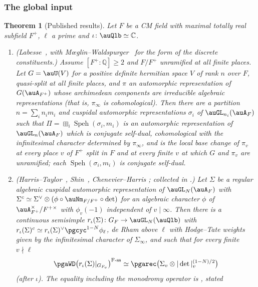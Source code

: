 \documentclass[10pt]{amsart}
\newtheorem{theorem}{Theorem}[section]
\theoremstyle{definition}
\theoremstyle{remark}
\newcommand{\C}{\mathbb C}
\newcommand{\Q}{\mathbb Q}
\begin{document}
\subsubsection{The global input}\label{pga:ss-global}

\begin{theorem}[Published results]\label{pga:lit}
Let $F$ be a CM field with maximal totally real subfield $F^+$, $\ell$ a prime and
$\iota\colon\auQlb\simeq\C$.
\begin{enumerate}
\item[(BC)] \emph{(Labesse~\cite{Labesse}, with M\oe glin--Waldspurger~\cite[Introduction, Th\'eor\`eme, p.~606]{MW89} for the
form of the discrete constituents.)} Assume $[F^+:\Q]\ge2$ and $F/F^+$ unramified at all finite
places. Let $G=\auU(V)$ for a positive definite
hermitian space $V$ of rank $n$ over $F$, quasi-split at all finite places, and $\pi$ an
automorphic representation of $G(\auA_{F^+})$ whose archimedean components are irreducible
algebraic representations (that is, $\pi_\infty$ is cohomological). Then there are a partition
$n=\sum_i n_im_i$ and cuspidal automorphic representations $\sigma_i$ of $\auGL_{n_i}(\auA_F)$ such
that $\Pi=\boxplus_i\operatorname{Speh}(\sigma_i,m_i)$ is an automorphic representation of
$\auGL_n(\auA_F)$ which is conjugate self-dual, cohomological with the infinitesimal character
determined by $\pi_\infty$, and is the local base change of $\pi_v$ at every place $v$ of $F^+$
split in $F$ and at every finite $v$ at which $G$ and $\pi_v$ are unramified; each
$\operatorname{Speh}(\sigma_i,m_i)$ is conjugate self-dual.
\item[(GR)] \emph{(Harris--Taylor~\cite{HarrisTaylor}, Shin~\cite{Shin}, Chenevier--Harris
\cite{ChenevierHarris}; collected in \cite[Thm.~2.1.1]{BLGGT}.)} Let $\Sigma$ be a regular
algebraic cuspidal automorphic representation of $\auGL_N(\auA_F)$ with $\Sigma^c\simeq\Sigma^\vee
\otimes(\phi\circ\auNm_{F/F^+}\circ\det)$ for an algebraic character $\phi$ of
$\auA_{F^+}^\times/F^{+\times}$ with $\phi_v(-1)$ independent of $v\mid\infty$. Then there is a
continuous semisimple $r_\iota(\Sigma)\colon G_F\to\auGL_N(\auQlb)$ with $r_\iota(\Sigma)^c\simeq
r_\iota(\Sigma)^\vee\pgcyc^{1-N}\phi_\ell$, de Rham above $\ell$ with Hodge--Tate weights given by
the infinitesimal character of $\Sigma_\infty$, and such that for every finite $v\nmid\ell$
\[
\pgaWD\bigl(r_\iota(\Sigma)|_{G_{F_v}}\bigr)^{\mathrm{F\text{-}ss}}\simeq\pgarec\bigl(\Sigma_v\otimes
|\det|_v^{(1-N)/2}\bigr)
\]
(after $\iota$). The equality \emph{including the monodromy operator} is \cite[Thm.~2.1.1(2)]{BLGGT}, stated

\end{enumerate}
\end{theorem}
\end{document}
